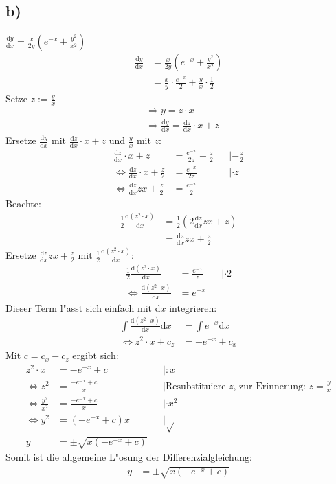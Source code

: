 \documentclass{theozettel}
\newcommand{\difd}{\text{d}}
\begin{document}
\subsection*{b)}$\frac{\text{d}y}{\text{d}x} = \frac{x}{2y}\left(e^{-x}+\frac{y^2}{x^2}\right)$\\
\begin{align*}
\frac{\text{d}y}{\text{d}x}&=\frac{x}{2y}\left(e^{-x}+\frac{y^2}{x^2}\right)\\
&=\frac{x}{y}\cdot\frac{e^{-x}}{2}+\frac{y}{x}\cdot\frac{1}{2}
\end{align*}
Setze $z:=\frac{y}{x}$\\ 
\begin{align*}
&\Rightarrow y=z\cdot x\\
&\Rightarrow \frac{\text{d}y}{\text{d}x}=\frac{\text{d}z}{\text{d}x}\cdot x +z
\end{align*}
Ersetze $\frac{\text{d}y}{\text{d}x}$ mit $\frac{\text{d}z}{\text{d}x}\cdot x+z$ und $\frac{y}{x}$ mit $z$:
\begin{align*}
\frac{\text{d}z}{\text{d}x}\cdot x +z&=\frac{e^{-x}}{2z}+\frac{z}{2} &&|-\frac{z}{2}\\
\Leftrightarrow\frac{\text{d}z}{\text{d}x}\cdot x +\frac{z}{2}&=\frac{e^{-x}}{2z} &&|\cdot z\\
\Leftrightarrow\frac{\difd z}{\difd x}zx+\frac{z}{2}&=\frac{e^{-x}}{2}
\end{align*}
Beachte:
\begin{align*}
\frac{1}{2}\frac{\text{d}\left(z^2\cdot x\right)}{\text{d}x}&=\frac{1}{2}\left(2\frac{\text{d}z}{\text{d}x}zx+z\right)\\
&=\frac{\difd z}{\difd x}zx+\frac{z}{2}
\end{align*}
Ersetze $\frac{\difd z}{\difd x}zx+\frac{z}{2}$ mit $\frac{1}{2}\frac{\text{d}\left(z^2\cdot x\right)}{\text{d}x}$:
\begin{align*}
\frac{1}{2}\frac{\text{d}\left(z^2\cdot x\right)}{\text{d}x}&=\frac{e^{-x}}{z}&&|\cdot 2\\
\Leftrightarrow\frac{\difd \left(z^2\cdot x\right)}{\difd x}&=e^{-x}
\end{align*}
Dieser Term l"asst sich einfach mit d$x$ integrieren:
\begin{align*}
\int\frac{\difd \left(z^2\cdot x\right)}{\difd x}\difd x &=\int e^{-x}\difd x\\
\Leftrightarrow z^2\cdot x +c_z&=-e^{-x}+c_x
\end{align*}
Mit $c=c_x-c_z$ ergibt sich:
\begin{align*}
z^2\cdot x &=-e^{-x}+c&&|:x\\
\Leftrightarrow z^2&=\frac{-e^{-x}+c}{x}&&|\text{Resubstituiere $z$, zur Erinnerung: $z=\frac{y}{x}$}\\
\Leftrightarrow\frac{y^2}{x^2}&=\frac{-e^{-x}+c}{x}&&|\cdot x^2\\
\Leftrightarrow y^2&=\left(-e^{-x}+c\right)x &&|\sqrt{}\\
y&= \pm\sqrt{x\left(-e^{-x}+c\right)}
\end{align*}
Somit ist die allgemeine L"osung der Differenzialgleichung:
\begin{align*}
y&= \pm\sqrt{x\left(-e^{-x}+c\right)}
\end{align*}
\end{document}
